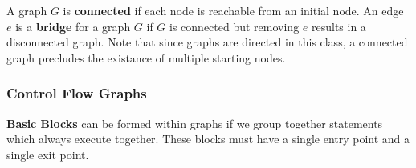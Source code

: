\documentclass[12pt]{article}
\begin{document}
A graph $G$ is {\bf connected} if each node is reachable from an initial node. An edge $e$ is a {\bf bridge} for a graph $G$ if $G$ is connected but removing $e$ results in a disconnected graph. Note that since graphs are directed in this class, a connected graph precludes the existance of multiple starting nodes.

\subsubsection{Control Flow Graphs}
{\bf Basic Blocks} can be formed within graphs if we group together statements which always execute together. These blocks must have a single entry point and a single exit point.
\end{document}
